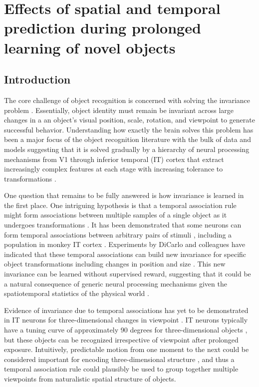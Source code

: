\documentclass[dwyatte_dissertation.tex]{subfiles}
\begin{document}
\sloppy

\chapter{Effects of spatial and temporal prediction during prolonged learning of novel objects}
\label{chap:bpleast}

\section{Introduction}
The core challenge of object recognition is concerned with solving the invariance problem \cite{DicarloZoccolanRust12}. Essentially, object identity must remain be invariant across large changes in a an object's visual position, scale, rotation, and viewpoint to generate successful behavior. Understanding how exactly the brain solves this problem has been a major focus of the object recognition literature with the bulk of data and models suggesting that it is solved gradually by a hierarchy of neural processing mechanisms from V1 through inferior temporal (IT) cortex that extract increasingly complex features at each stage with increasing tolerance to transformations \cite{Fukushima80,RiesenhuberPoggio99,WallisRolls97,MasquelierThorpe07,OReillyWyatteHerdEtAl13}.

One question that remains to be fully answered is how invariance is learned in the first place. One intriguing hypothesis is that a temporal association rule might form associations between multiple samples of a single object as it undergoes transformations \cite{StringerPerryRollsEtAl06,WallisBaddeley97,IsikLeiboPoggio12}. It has been demonstrated that some neurons can form temporal associations between arbitrary pairs of stimuli \cite{SakaiMiyashita91}, including a population in monkey IT cortex \cite{MeyerOlson11}. Experiments by DiCarlo and colleagues have indicated that these temporal associations can build new invariance for specific object transformations including changes in position and size \cite{CoxMeierOerteltEtAl05,LiDiCarlo08,LiDiCarlo10}. This new invariance can be learned without supervised reward, suggesting that it could be a natural consequence of generic neural processing mechanisms given the spatiotemporal statistics of the physical world \cite{LiDiCarlo12}.

Evidence of invariance due to temporal associations has yet to be demonstrated in IT neurons for three-dimensional changes in viewpoint \cite[although see][for relevant human behavioral work]{WallisBulthoff01,WallisBackusLangerEtAl09}. IT neurons typically have a tuning curve of approximately 90 degrees for three-dimensional objects \cite{LogothetisPaulsBulthoffEtAl94,LogothetisPaulsPoggio95}, but these objects can be recognized irrespective of viewpoint after prolonged exposure\cite{WallisBulthoff99,EdelmanBulthoff92,TarrGauthier98}. Intuitively, predictable motion from one moment to the next could be considered important for encoding three-dimensional structure \cite{LawsonHumphreysWatson94,Stone98,VuongTarr04,BalasSinha09b,BalasSinha09c,ChuangVuongBulthoff12}, and thus a temporal association rule could plausibly be used to group together multiple viewpoints from naturalistic spatial structure of objects.
\end{document}
